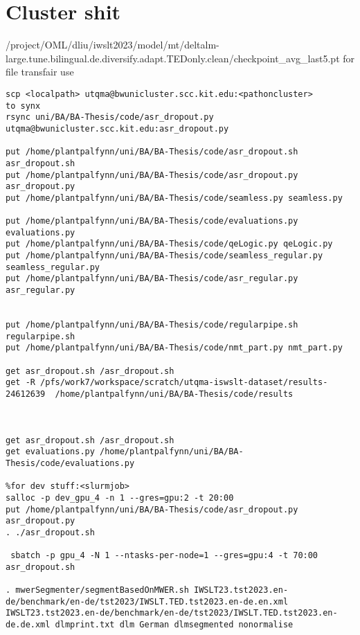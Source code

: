 \section{Cluster shit}
/project/OML/dliu/iwslt2023/model/mt/deltalm-large.tune.bilingual.de.diversify.adapt.TEDonly.clean/checkpoint_avg_last5.pt
for file transfair use
\begin{verbatim}
scp <localpath> utqma@bwunicluster.scc.kit.edu:<pathoncluster>
to synx
rsync uni/BA/BA-Thesis/code/asr_dropout.py utqma@bwunicluster.scc.kit.edu:asr_dropout.py

put /home/plantpalfynn/uni/BA/BA-Thesis/code/asr_dropout.sh asr_dropout.sh
put /home/plantpalfynn/uni/BA/BA-Thesis/code/asr_dropout.py asr_dropout.py
put /home/plantpalfynn/uni/BA/BA-Thesis/code/seamless.py seamless.py

put /home/plantpalfynn/uni/BA/BA-Thesis/code/evaluations.py evaluations.py
put /home/plantpalfynn/uni/BA/BA-Thesis/code/qeLogic.py qeLogic.py
put /home/plantpalfynn/uni/BA/BA-Thesis/code/seamless_regular.py seamless_regular.py
put /home/plantpalfynn/uni/BA/BA-Thesis/code/asr_regular.py asr_regular.py


put /home/plantpalfynn/uni/BA/BA-Thesis/code/regularpipe.sh regularpipe.sh
put /home/plantpalfynn/uni/BA/BA-Thesis/code/nmt_part.py nmt_part.py

get asr_dropout.sh /asr_dropout.sh
get -R /pfs/work7/workspace/scratch/utqma-iswslt-dataset/results-24612639  /home/plantpalfynn/uni/BA/BA-Thesis/code/results



get asr_dropout.sh /asr_dropout.sh
get evaluations.py /home/plantpalfynn/uni/BA/BA-Thesis/code/evaluations.py
 
%for dev stuff:<slurmjob>
salloc -p dev_gpu_4 -n 1 --gres=gpu:2 -t 20:00
put /home/plantpalfynn/uni/BA/BA-Thesis/code/asr_dropout.py asr_dropout.py
. ./asr_dropout.sh

 sbatch -p gpu_4 -N 1 --ntasks-per-node=1 --gres=gpu:4 -t 70:00 asr_dropout.sh
 
. mwerSegmenter/segmentBasedOnMWER.sh IWSLT23.tst2023.en-de/benchmark/en-de/tst2023/IWSLT.TED.tst2023.en-de.en.xml IWSLT23.tst2023.en-de/benchmark/en-de/tst2023/IWSLT.TED.tst2023.en-de.de.xml dlmprint.txt dlm German dlmsegmented nonormalise
\end{verbatim}


